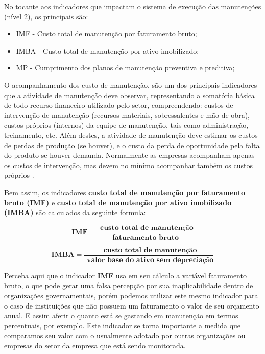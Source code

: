 No tocante aos indicadores que impactam o sistema de execução das manutenções (nível 2), os principais são:

\begin{itemize}
	\item IMF - Custo total de manutenção por faturamento bruto;
	\item IMBA - Custo total de manutenção por ativo imobilizado;
	\item MP - Cumprimento dos planos de manutenção preventiva e preditiva;
	\end{itemize}

O acompanhamento dos custo de manutenção, são um dos principais indicadores que a atividade de manutenção deve observar, representando a somatória básica de todo recurso financeiro utilizado pelo setor, compreendendo: custos de intervenção de manutenção (recursos materiais, sobressalentes e mão de obra), custos próprios (internos) da equipe de manutenção, tais como administração, treinamento, etc. Além destes, a atividade de manutenção deve estimar os custos de perdas de produção (se houver), e o custo da perda de oportunidade pela falta do produto se houver demanda. Normalmente as empresas acompanham apenas os custos de intervenção, mas devem no mínimo acompanhar também os custos próprios \cite{ZEN2008}.

Bem assim, os indicadores \textbf{custo total de manutenção por faturamento bruto (IMF)} e \textbf{custo total de manutenção por ativo imobilizado (IMBA)} são calculados da seguinte formula: 

\begin{equation}
\label{eqn04}
	\mathbf{IMF} = \mathbf{\frac{\textrm{ custo total de manutenção}}{\textrm{faturamento bruto}}} 
\end{equation}

\begin{equation}
\label{eqn05}
	\mathbf{IMBA} = \mathbf{\frac{\textrm{ custo total de manutenção}}{\textrm{ valor base do ativo sem depreciação}}} 
\end{equation}

Perceba aqui que o indicador \textbf{IMF} usa em seu cálculo a variável faturamento bruto, o que pode gerar uma falsa percepção por sua inaplicabilidade dentro de organizações governamentais, porém podemos utilizar este mesmo indicador para o caso de instituições que não possuem um faturamento o valor de seu orçamento anual. E assim aferir o quanto está se gastando em manutenção em termos percentuais, por exemplo. Este indicador se torna importante a medida que comparamos seu valor com o usualmente adotado por outras organizações ou empresas do setor da empresa que está sendo monitorada.

